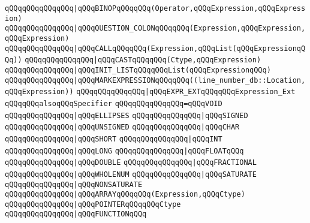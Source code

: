 \verb|qQQqqQQqqQQqqQQq|\verb#|qQQqBINOPqQQqqQQq(Operator,qQQqExpression,qQQqExpression)#\newline
\verb|qQQqqQQqqQQqqQQq|\verb#|qQQqQUESTION_COLONqQQqqQQq(Expression,qQQqExpression,qQQqExpression)#\newline
\verb|qQQqqQQqqQQqqQQq|\verb#|qQQqCALLqQQqqQQq(Expression,qQQqList(qQQqExpressionqQQq))#\newline
\verb|qQQqqQQqqQQqqQQq|\verb#|qQQqCASTqQQqqQQq(Ctype,qQQqExpression)#\newline
\verb|qQQqqQQqqQQqqQQq|\verb#|qQQqINIT_LISTqQQqqQQqList(qQQqExpressionqQQq)#\newline
\verb|qQQqqQQqqQQqqQQq|\verb#|qQQqMARKEXPRESSIONqQQqqQQq((line_number_db::Location,qQQqExpression))#\newline
\verb|qQQqqQQqqQQqqQQq|\verb#|qQQqEXPR_EXTqQQqqQQqExpression_Ext#\newline
\newline
\verb|qQQqqQQqalsoqQQqSpecifier|\newline
\verb|qQQqqQQqqQQqqQQq=qQQqVOID|\newline
\verb|qQQqqQQqqQQqqQQq|\verb#|qQQqELLIPSES#\newline
\verb|qQQqqQQqqQQqqQQq|\verb#|qQQqSIGNED#\newline
\verb|qQQqqQQqqQQqqQQq|\verb#|qQQqUNSIGNED#\newline
\verb|qQQqqQQqqQQqqQQq|\verb#|qQQqCHAR#\newline
\verb|qQQqqQQqqQQqqQQq|\verb#|qQQqSHORT#\newline
\verb|qQQqqQQqqQQqqQQq|\verb#|qQQqINT#\newline
\verb|qQQqqQQqqQQqqQQq|\verb#|qQQqLONG#\newline
\verb|qQQqqQQqqQQqqQQq|\verb#|qQQqFLOATqQQq#\newline
\verb|qQQqqQQqqQQqqQQq|\verb#|qQQqDOUBLE#\newline
\verb|qQQqqQQqqQQqqQQq|\verb#|qQQqFRACTIONAL#\newline
\verb|qQQqqQQqqQQqqQQq|\verb#|qQQqWHOLENUM#\newline
\verb|qQQqqQQqqQQqqQQq|\verb#|qQQqSATURATE#\newline
\verb|qQQqqQQqqQQqqQQq|\verb#|qQQqNONSATURATE#\newline
\verb|qQQqqQQqqQQqqQQq|\verb#|qQQqARRAYqQQqqQQq(Expression,qQQqCtype)#\newline
\verb|qQQqqQQqqQQqqQQq|\verb#|qQQqPOINTERqQQqqQQqCtype#\newline
\verb|qQQqqQQqqQQqqQQq|\verb#|qQQqFUNCTIONqQQq#\newline
